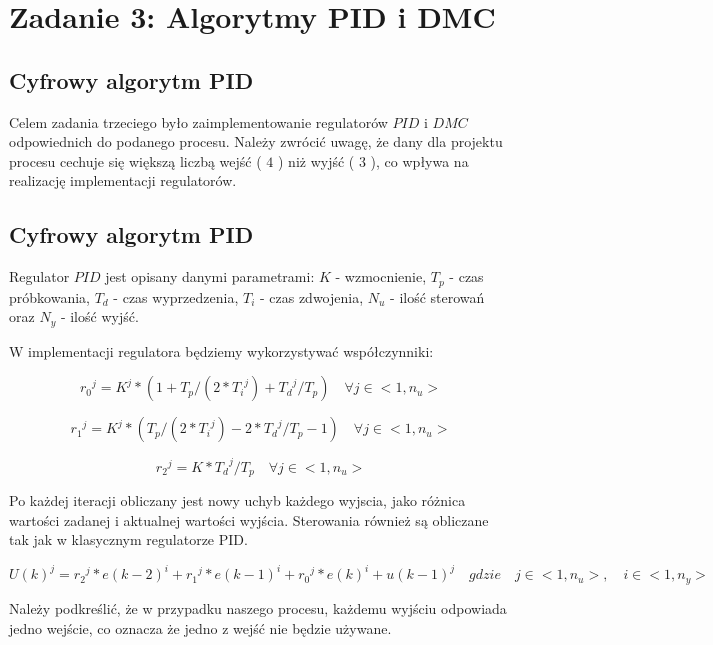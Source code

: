 \chapter{Zadanie 3: Algorytmy PID i DMC}
\section{Cyfrowy algorytm PID}

Celem zadania trzeciego było zaimplementowanie regulatorów $PID$ i $DMC$ odpowiednich do podanego procesu. Należy zwrócić uwagę, że dany dla projektu procesu
cechuje się większą liczbą wejść ( $4$ ) niż wyjść ( $3$ ), co wpływa na realizację implementacji regulatorów.

\section{Cyfrowy algorytm PID}

Regulator $PID$ jest opisany danymi parametrami: $K$ - wzmocnienie, $T_p$ - czas próbkowania, $T_d$ - czas wyprzedzenia, $T_i$ - czas zdwojenia, $N_u$ - ilość sterowań oraz $N_y$ - ilość wyjść.

W implementacji regulatora będziemy wykorzystywać współczynniki:

\begin{equation}
{r_0}^j=K^j*(1+T_p/(2*{T_i}^j)+{T_d}^j/T_p) \quad \forall j \in <1,n_u>
\label{r0}
\end{equation}


\begin{equation}
{r_1}^j=K^j*(T_p/(2*{T_i}^j)-2*{T_d}^j/T_p-1) \quad \forall j \in <1,n_u>
\label{r1}
\end{equation}

\begin{equation}
{r_2}^j=K*{T_d}^j/T_p \quad \forall j \in <1,n_u>
\label{r2}
\end{equation}

Po każdej iteracji obliczany jest nowy uchyb każdego wyjscia, jako różnica wartości zadanej i aktualnej wartości wyjścia.
Sterowania również są obliczane tak jak w klasycznym regulatorze PID.

\begin{equation}
U(k)^j = {r_2}^j*e(k-2)^i + {r_1}^j*e(k-1)^i + {r_0}^j*e(k)^i + u(k-1)^j \quad gdzie \quad j \in <1,n_u>, \quad i \in <1,n_y>
\label{Uk}
\end{equation}

Należy podkreślić, że w przypadku naszego procesu, każdemu wyjściu odpowiada jedno wejście, co oznacza że jedno z wejść nie będzie używane.


